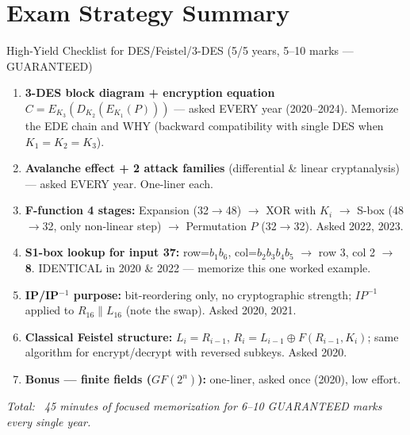 \documentclass[12pt,a4paper]{article}
\begin{document}
\section*{Exam Strategy Summary}

\begin{keybox}{High-Yield Checklist for DES/Feistel/3-DES (5/5 years, 5--10 marks --- GUARANTEED)}
\begin{enumerate}[noitemsep]
  \item \textbf{3-DES block diagram + encryption equation} $C=E_{K_3}(D_{K_2}(E_{K_1}(P)))$ --- asked EVERY year (2020--2024). Memorize the EDE chain and WHY (backward compatibility with single DES when $K_1=K_2=K_3$).
  \item \textbf{Avalanche effect + 2 attack families} (differential \& linear cryptanalysis) --- asked EVERY year. One-liner each.
  \item \textbf{F-function 4 stages:} Expansion (32$\to$48) $\to$ XOR with $K_i$ $\to$ S-box (48$\to$32, only non-linear step) $\to$ Permutation $P$ (32$\to$32). Asked 2022, 2023.
  \item \textbf{S1-box lookup for input 37:} row=$b_1b_6$, col=$b_2b_3b_4b_5$ $\to$ row 3, col 2 $\to$ \textbf{8}. IDENTICAL in 2020 \& 2022 --- memorize this one worked example.
  \item \textbf{IP/IP$^{-1}$ purpose:} bit-reordering only, no cryptographic strength; $IP^{-1}$ applied to $R_{16}\|L_{16}$ (note the swap). Asked 2020, 2021.
  \item \textbf{Classical Feistel structure:} $L_i=R_{i-1}$, $R_i=L_{i-1}\oplus F(R_{i-1},K_i)$; same algorithm for encrypt/decrypt with reversed subkeys. Asked 2020.
  \item \textbf{Bonus --- finite fields ($GF(2^n)$):} one-liner, asked once (2020), low effort.
\end{enumerate}
\textit{Total: ~45 minutes of focused memorization for 6--10 GUARANTEED marks every single year.}
\end{keybox}
\end{document}
